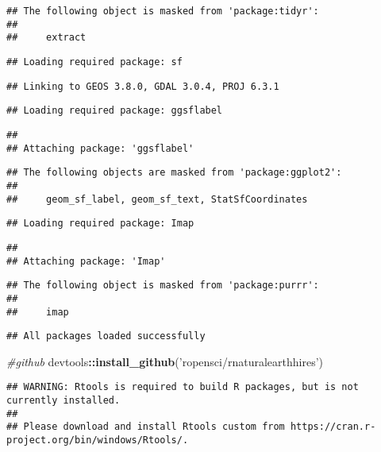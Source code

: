 \documentclass[
]{article}
\newenvironment{Shaded}{\begin{snugshade}}{\end{snugshade}}
\newcommand{\CommentTok}[1]{\textcolor[rgb]{0.56,0.35,0.01}{\textit{#1}}}
\newcommand{\KeywordTok}[1]{\textcolor[rgb]{0.13,0.29,0.53}{\textbf{#1}}}
\newcommand{\NormalTok}[1]{#1}
\newcommand{\OperatorTok}[1]{\textcolor[rgb]{0.81,0.36,0.00}{\textbf{#1}}}
\newcommand{\StringTok}[1]{\textcolor[rgb]{0.31,0.60,0.02}{#1}}
\begin{document}
\begin{verbatim}
## The following object is masked from 'package:tidyr':
## 
##     extract
\end{verbatim}

\begin{verbatim}
## Loading required package: sf
\end{verbatim}

\begin{verbatim}
## Linking to GEOS 3.8.0, GDAL 3.0.4, PROJ 6.3.1
\end{verbatim}

\begin{verbatim}
## Loading required package: ggsflabel
\end{verbatim}

\begin{verbatim}
## 
## Attaching package: 'ggsflabel'
\end{verbatim}

\begin{verbatim}
## The following objects are masked from 'package:ggplot2':
## 
##     geom_sf_label, geom_sf_text, StatSfCoordinates
\end{verbatim}

\begin{verbatim}
## Loading required package: Imap
\end{verbatim}

\begin{verbatim}
## 
## Attaching package: 'Imap'
\end{verbatim}

\begin{verbatim}
## The following object is masked from 'package:purrr':
## 
##     imap
\end{verbatim}

\begin{verbatim}
## All packages loaded successfully
\end{verbatim}

\begin{Shaded}
\begin{Highlighting}[]
\CommentTok{#github}
\NormalTok{devtools}\OperatorTok{::}\KeywordTok{install_github}\NormalTok{(}\StringTok{'ropensci/rnaturalearthhires'}\NormalTok{)}
\end{Highlighting}
\end{Shaded}

\begin{verbatim}
## WARNING: Rtools is required to build R packages, but is not currently installed.
## 
## Please download and install Rtools custom from https://cran.r-project.org/bin/windows/Rtools/.
\end{verbatim}
\end{document}
